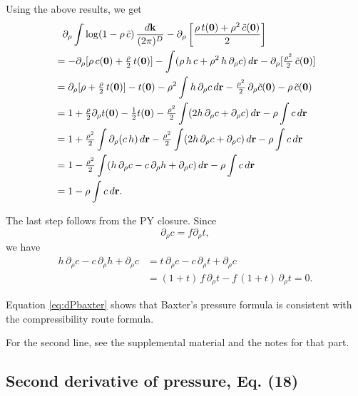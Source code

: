\documentclass[preprint]{revtex4-1}
\numberwithin{equation}{subsection}
\numberwithin{table}{section}
\newcommand{\vct}[1]{\mathbf{#1}}
\providecommand{\vr}{} %
\renewcommand{\vr}{\vct{r}}
\newcommand{\vk}{\vct{k}}
\newcommand{\dvk}{\frac{d\vk}{(2\pi)^D}}
\begin{document}
Using the above results, we get
\begin{align}
  &\hphantom{=}  \partial_\rho \int
    \log(1-\rho \, \tilde{c})
   \, \dvk
  -\partial_\rho \left[
    \frac{\rho \, t(\vct 0) + \rho^2 \, \tilde{c}(\vct{0}) } {2}
  \right] \notag \\
&= -\partial_\rho [\rho \, c(\vct 0)+ \tfrac{ \rho }{2} \, t(\vct 0) ]
  -\int ( \rho \, h \, c + \rho^2 \, h \, \partial_\rho c ) \, d\vr
  - \partial_\rho [\tfrac{\rho^2}{2} \, \tilde{c}(\vct 0)]
\notag \\
&= \partial_\rho [\rho + \tfrac{ \rho }{2} \, t(\vct 0)]
  -t(\vct 0)
  -\rho^2 \int h \, \partial_\rho c \, d\vr
  - \tfrac{\rho^2}{2} \, \partial_\rho \tilde{c}(\vct 0)
  - \rho \, \tilde{c}(\vct 0)
\notag \\
&= 1 + \tfrac{\rho}{2} \partial_\rho t(\vct 0)
  - \tfrac{1}{2} t(\vct 0)
  - \tfrac{\rho^2}{2} \int (2 h \, \partial_\rho c + \partial_\rho c) \, d\vr
  - \rho \int c \, d\vr \notag \\
&= 1 +
  \tfrac{\rho^2}{2} \int \partial_\rho( c\, h) \, d\vr
  - \tfrac{\rho^2}{2} \int (2 h \, \partial_\rho c + \partial_\rho c) \, d\vr
  - \rho \int c \, d\vr \notag \\
&= 1
  - \tfrac{\rho^2}{2} \int (h \, \partial_\rho c - c \, \partial_\rho h + \partial_\rho c) \, d\vr
  - \rho \int c \, d\vr \notag \\
&= 1
  - \rho \int c \, d\vr.
  \label{eq:dPbaxter}
\end{align}

The last step follows from the PY closure.
Since
\[
  \partial_\rho c = f\partial_\rho t,
\]
we have
\begin{align*}
  h \, \partial_\rho c - c \, \partial_\rho h + \partial_\rho c
&= t \, \partial_\rho c - c \, \partial_\rho t + \partial_\rho c \\
&= (1 + t) \, f \, \partial_\rho t - f \, (1 + t) \, \partial_\rho t = 0.
\end{align*}

Equation \eqref{eq:dPbaxter} shows that Baxter's pressure
formula is consistent with the compressibility route formula.

For the second line, see the supplemental material
and the notes for that part.



\subsection{Second derivative of pressure, Eq. (18)}
\end{document}
